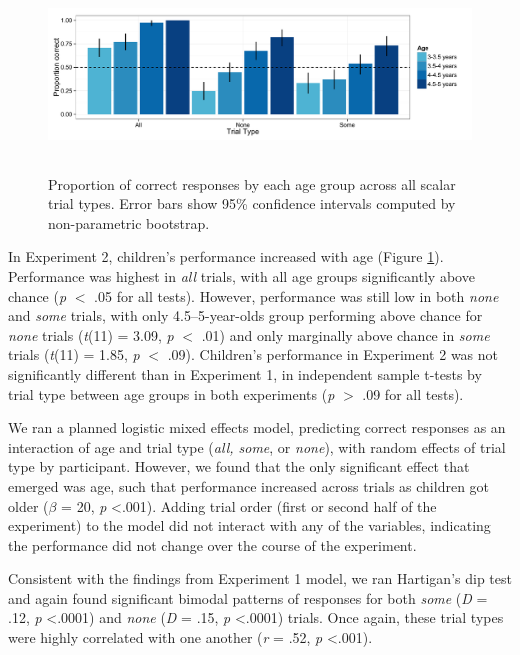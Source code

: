 \documentclass[man]{apa2}
\begin{document}
\begin{figure} 
 \begin{center} 
  \includegraphics[height=2in]{figures/exp2_performance.pdf} 
  \caption{\label{fig:exp2_perf} Proportion of correct responses by each age group across all scalar trial types.  Error bars show 95\% confidence intervals computed by non-parametric bootstrap.} 
 \end{center} 
\end{figure}

In Experiment 2, children's performance increased with age (Figure \ref{fig:exp2_perf}). Performance was highest in \textit{all} trials, with all age groups significantly above chance (\emph{p} $<$ .05 for all tests). However, performance was still low in both \textit{none} and \textit{some} trials, with only 4.5--5-year-olds group performing above chance for \textit{none} trials (\textit{t}(11) = 3.09, \textit{p} $<$ .01) and only marginally above chance in \textit{some} trials (\textit{t}(11) = 1.85, \textit{p} $<$ .09). Children's performance in Experiment 2 was not significantly different than in Experiment 1, in independent sample t-tests by trial type between age groups in both experiments (\emph{p} $>$ .09 for all tests). 

We ran a planned logistic mixed effects model, predicting correct responses as an interaction of age and trial type (\textit{all, some}, or \textit{none}), with random effects of trial type by participant. However, we found that the only significant effect that emerged was age, such that performance increased across trials as children got older ($\beta$ = 20, \textit{p} \textless  .001). Adding trial order (first or second half of the experiment) to the model did not interact with any of the variables, indicating the performance did not change over the course of the experiment. 

Consistent with the findings from Experiment 1 model, we  ran Hartigan's dip test and again found significant bimodal patterns of responses for both \textit{some} (\textit{D} = .12, \textit{p} \textless  .0001) and \textit{none} (\textit{D} = .15, \textit{p} \textless  .0001) trials. Once again, these trial types were highly correlated with one another (\textit{r} = .52, \textit{p} \textless  .001). 
\end{document}
